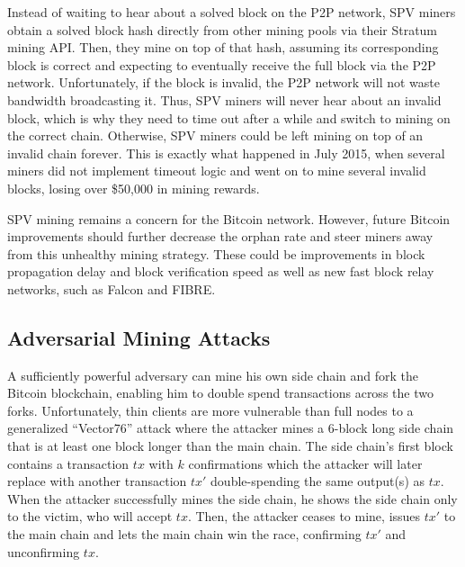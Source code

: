 Instead of waiting to hear about a solved block on the P2P network, SPV miners obtain a solved block hash directly from other mining pools via their Stratum mining API\cite{stratum}.
Then, they mine on top of that hash, assuming its corresponding block is correct and expecting to eventually receive the full block via the P2P network.
Unfortunately, if the block is invalid, the P2P network will not waste bandwidth broadcasting it.
Thus, SPV miners will never hear about an invalid block, which is why they need to time out after a while and switch to mining on the correct chain.
Otherwise, SPV miners could be left mining on top of an invalid chain forever.
This is exactly what happened in July 2015, when several miners did not implement timeout logic and went on to mine several invalid blocks, losing over \$50,000 in mining rewards\cite{july2015fork}.

SPV mining remains a concern for the Bitcoin network.
However, future Bitcoin improvements should further decrease the orphan rate and steer miners away from this unhealthy mining strategy.
These could be improvements in block propagation delay and block verification speed as well as new fast block relay networks, such as Falcon\cite{falcon} and FIBRE\cite{fibre}.


\subsection{Adversarial Mining Attacks}
\label{sec:attacks:adversarial-mining}
A sufficiently powerful adversary can mine his own side chain and fork the Bitcoin blockchain, enabling him to double spend transactions across the two forks.
Unfortunately, thin clients are more vulnerable than full nodes to a generalized ``Vector76'' attack where the attacker mines a 6-block long side chain that is at least one block longer than the main chain\cite{bitcoin-security-revisited}.
The side chain's first block contains a transaction $tx$ with $k$ confirmations which the attacker will later replace with another transaction $tx'$ double-spending the same output(s) as $tx$.
When the attacker successfully mines the side chain, he shows the side chain only to the victim, who will accept $tx$.
Then, the attacker ceases to mine, issues $tx'$ to the main chain and lets the main chain win the race, confirming $tx'$ and unconfirming $tx$.

